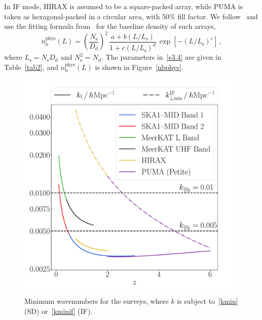 In IF mode, HIRAX is assumed to be a square-packed array, while PUMA is taken as hexagonal-packed in a circular area, {with 50\% fill factor}. We follow~\cite{Karagiannis:2019jjx} and use the fitting formula from~\cite{Ansari:2018ury} for the baseline density of such arrays,
\begin{equation}
n_\mathrm{b}^\mathrm{phys}(L) = \left(\frac{N_\mathrm{s}}{D_\mathrm{d}}\right)^2\,\frac{a+b\left(L/L_\mathrm{s}\right)}{1+c\left(L/L_\mathrm{s}\right)^{d}}\,\exp{\left[-(L/L_\mathrm{s})^{e}\right]}\,, \label{e3.4}
\end{equation}
where $L_\mathrm{s} = N_\mathrm{s} D_\mathrm{d}$ and $N_\mathrm{s}^2 = N_\mathrm{d}$.
The parameters in~\eqref{e3.4} are given in Table~\ref{tab2}, and $n_\mathrm{b}^\mathrm{phys}(L)$ is shown in Figure~\ref{nbphys}.
\begin{figure}
\centering
\includegraphics[width=.8\textwidth]{fig/k}
\caption{Minimum wavenumbers for the surveys, where $k$ is subject to~\eqref{kmin} (SD) or~\eqref{kminif} (IF).}\label{figmin}
\end{figure}
